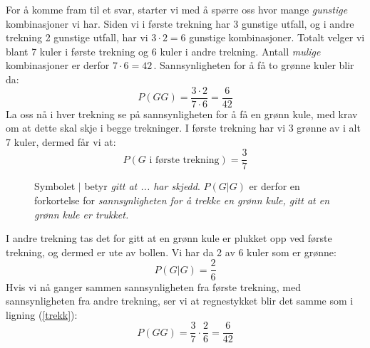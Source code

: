For å komme fram til et svar, starter vi med å spørre oss hvor mange \textit{gunstige} kombinasjoner vi har. Siden vi i første trekning har 3 gunstige utfall, og i andre trekning 2 gunstige utfall, har vi $3\cdot2=6$ gunstige kombinasjoner. Totalt velger vi blant 7 kuler i første trekning og 6 kuler i andre trekning. Antall \textit{mulige} kombinasjoner er derfor $7\cdot6=42$\,. Sannsynligheten for å få to grønne kuler blir da:
\begin{equation}
P(GG)=\frac{3\cdot2}{7\cdot6}=\frac{6}{42} \label{trekk}
\end{equation}
La oss nå i hver trekning se på sannsynligheten for å få en grønn kule, med krav om at dette skal skje i begge trekninger. I første trekning har vi 3 grønne av i alt 7 kuler, dermed får vi at:
\[ P(G \text{ i første trekning})=\frac{3}{7} \]
\begin{figure}
	\vspace{-22 pt}
	\begin{shaded*}
		Symbolet $ | $ betyr \textit{\textsl{gitt} at ... har skjedd}. $ P(G|G) $ er derfor en forkortelse for \textit{sannsynligheten for å trekke en grønn kule, gitt at en grønn kule er trukket.}
	\end{shaded*}
\end{figure}
I andre trekning tas det for gitt at en grønn kule er plukket opp ved første trekning, og dermed er ute av bollen. Vi har da 2 av 6 kuler som er grønne:
\[ P(G|G)=\frac{2}{6} \]
Hvis vi nå ganger sammen sannsynligheten fra første trekning, med sannsynligheten fra andre trekning, ser vi at regnestykket blir det samme som i ligning (\ref{trekk}):
\[ P(GG)=\frac{3}{7}\cdot\frac{2}{6}=\frac{6}{42} \]


